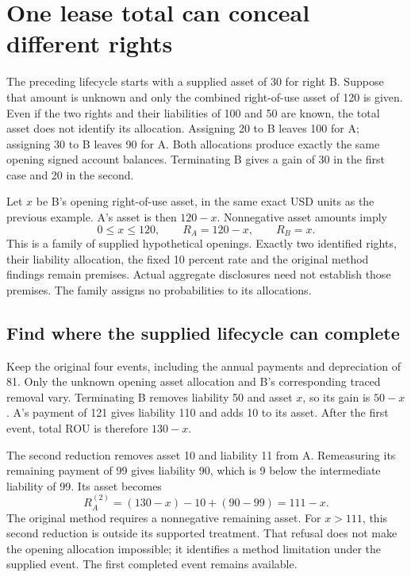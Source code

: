 \section{One lease total can conceal different rights}
\label{sec:lease-allocation-family}

The preceding lifecycle starts with a supplied asset of 30 for right B.
Suppose that amount is unknown and only the combined right-of-use asset of 120
is given. Even if the two rights and their liabilities of 100 and 50 are known,
the total asset does not identify its allocation. Assigning 20 to B leaves 100
for A; assigning 30 to B leaves 90 for A. Both allocations produce exactly the
same opening signed account balances. Terminating B gives a gain of 30 in the
first case and 20 in the second.

Let $x$ be B's opening right-of-use asset, in the same exact USD units as the
previous example. A's asset is then $120-x$. Nonnegative asset amounts imply
\[
  0\leq x\leq120,\qquad R_A=120-x,\qquad R_B=x.
\]
This is a family of supplied hypothetical openings. Exactly two identified
rights, their liability allocation, the fixed 10 percent rate and the original
method findings remain premises. Actual aggregate disclosures need not establish
those premises. The family assigns no probabilities to its allocations.

\subsection{Find where the supplied lifecycle can complete}

Keep the original four events, including the annual payments and depreciation
of 81. Only the unknown opening asset allocation and B's corresponding traced
removal vary. Terminating B removes liability 50 and asset $x$, so its gain is
$50-x$. A's payment of 121 gives liability 110 and adds 10 to its asset. After
the first event, total ROU is therefore $130-x$.

The second reduction removes asset 10 and liability 11 from A. Remeasuring its
remaining payment of 99 gives liability 90, which is 9 below the intermediate
liability of 99. Its asset becomes
\[
  R_A^{(2)}=(130-x)-10+(90-99)=111-x.
\]
The original method requires a nonnegative remaining asset. For $x>111$, this
second reduction is outside its supported treatment. That refusal does not make
the opening allocation impossible; it identifies a method limitation under the
supplied event. The first completed event remains available.

